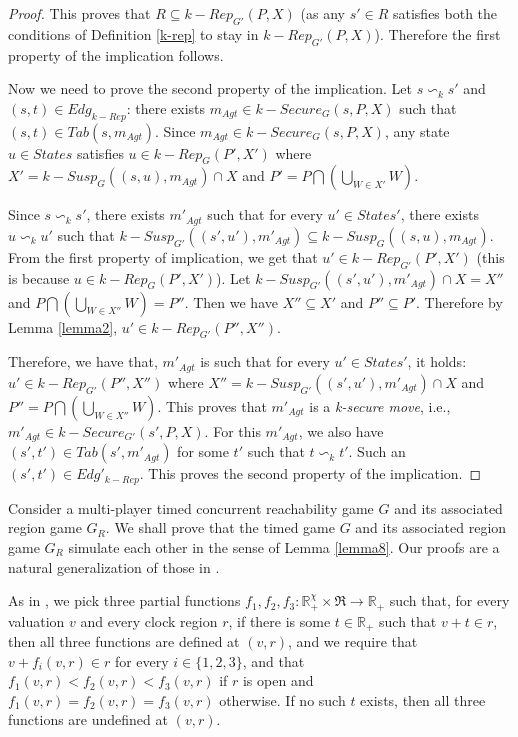 \begin{proof}
This proves that $R \subseteq k-Rep_{G'}(P, X)$ (as any $s' \in R$ satisfies both the conditions of Definition \ref{k-rep} to stay in $k-Rep_{G'}(P, X)$). Therefore the first property of the implication follows.

Now we need to prove the second property of the implication. Let $s \backsim_{k} s'$ and $(s, t) \in Edg_{k-Rep}$: there exists $m_{Agt} \in k-Secure_{G}(s, P, X)$ such that $(s, t) \in Tab(s, m_{Agt})$. Since $m_{Agt} \in k-Secure_{G}(s, P, X)$, any state $u \in States$ satisfies $u \in k-Rep_{G}(P', X')$ where $X' = k-Susp_{G}((s, u), m_{Agt}) \cap X$ and $P' = P \bigcap \left( \bigcup \limits_{W \in X'}W \right)$.

Since $s \backsim_{k} s'$, there exists $m'_{Agt}$ such that for every $u' \in States'$, there exists $u \backsim_{k} u'$ such that $k-Susp_{G'}((s', u'), m'_{Agt}) \subseteq k-Susp_{G}((s, u), m_{Agt})$. From the first property of implication, we get that $u' \in k-Rep_{G'}(P', X')$ (this is because $u \in k-Rep_{G}(P', X')$). Let $k-Susp_{G'}((s', u'), m'_{Agt}) \cap X = X''$ and $P \bigcap \left( \bigcup \limits_{W \in X''}W \right) = P''$. Then we have $X'' \subseteq X'$ and $P'' \subseteq P'$. Therefore by Lemma \ref{lemma2}, $u' \in k-Rep_{G'}(P'', X'')$.

Therefore, we have that, $m'_{Agt}$ is such that for every $u' \in States'$, it holds: $u' \in k-Rep_{G'}(P'', X'')$ where $X'' = k-Susp_{G'}((s', u'), m'_{Agt}) \cap X$ and $P'' = P \bigcap \left( \bigcup \limits_{W \in X''}W \right)$. This proves that $m'_{Agt}$ is a \textit{k-secure move}, i.e., $m'_{Agt} \in k-Secure_{G'}(s', P, X)$. For this $m'_{Agt}$, we also have $(s', t') \in Tab(s', m'_{Agt})$ for some $t'$ such that $t \backsim_{k} t'$. Such an $(s', t') \in Edg'_{k-Rep}$. This proves the second property of the implication.
\end{proof}

Consider a multi-player timed concurrent reachability game $G$ and its associated region game $G_{R}$. We shall prove that the timed game $G$ and its associated region game $G_{R}$ simulate each other in the sense of Lemma \ref{lemma8}. Our proofs are a natural generalization of those in \cite{BBM-concur10,BBM-report}.

As in \cite{BBM-concur10,BBM-report}, we pick three partial functions $f_{1}, f_{2}, f_{3}: \mathbb{R}_{+}^{\chi} \times \Re \rightarrow \mathbb{R}_{+}$ such that, for every valuation $v$ and every clock region $r$, if there is some $t \in \mathbb{R}_{+}$ such that $v + t \in r$, then all three functions are defined at $(v, r)$, and we require that $v + f_{i}(v, r) \in r$ for every $i \in \lbrace 1, 2, 3 \rbrace$, and that $f_{1}(v, r) < f_{2}(v, r) < f_{3}(v, r)$ if $r$ is open and $f_{1}(v, r) = f_{2}(v, r) = f_{3}(v, r)$ otherwise. If no such $t$ exists, then all three functions are undefined at $(v, r)$.

